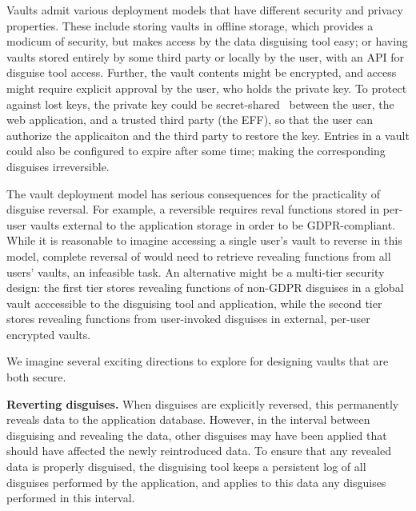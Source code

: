 %
Vaults admit various deployment models that have different security and privacy
properties.
%
%
These include storing vaults in offline storage, which provides a modicum of security,
but makes access by the data disguising tool easy; or having vaults stored entirely by
some third party or locally by the user, with an API for disguise tool access.
%
Further, the vault contents might be encrypted, and access might require explicit approval
by the user, who holds the private key.
%
To protect against lost keys, the private key could be secret-shared~\cite{secretsharing}
between the user, the web application, and a trusted third party (\eg the EFF), so that
the user can authorize the applicaiton and the third party to restore the key.
%
Entries in a vault could also be configured to expire after some time; making the
corresponding disguises irreversible.
%

%
The vault deployment model has serious consequences for the practicality of disguise
reversal.
%
For example, a reversible \gdpr requires reval functions stored in per-user vaults
external to the application storage in order to be GDPR-compliant.
%
While it is reasonable to imagine accessing a single user's vault to reverse \gdpr in
this model, complete reversal of \ca would need to retrieve revealing functions from
all users' vaults, an infeasible task.
%
An alternative might be a multi-tier security design: the first tier stores revealing
functions of non-GDPR disguises in a global vault acccessible to the disguising tool
and application, while the second tier stores revealing functions from user-invoked
disguises in external, per-user encrypted vaults.

We imagine several exciting directions to explore for designing vaults that are both
secure.
%

\textbf{Reverting disguises.}
%
When disguises are explicitly reversed, this permanently reveals data to the application database.
However, in the interval between disguising and revealing the data, other disguises may have been applied that
should have affected the newly reintroduced data. To ensure that any revealed data is properly disguised,
the disguising tool keeps a persistent log of all disguises performed by the application, and
applies to this data any disguises performed in this interval.

